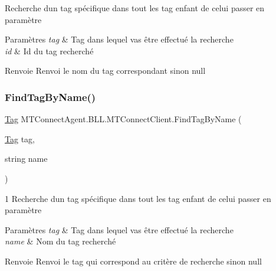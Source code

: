 Recherche d\textquotesingle{}un tag spécifique dans tout les tag enfant de celui passer en paramètre 


\begin{DoxyParams}{Paramètres}
{\em tag} & Tag dans lequel vas être effectué la recherche\\
\hline
{\em id} & Id du tag recherché\\
\hline
\end{DoxyParams}
\begin{DoxyReturn}{Renvoie}
Renvoi le nom du tag correspondant sinon null
\end{DoxyReturn}
\mbox{\label{class_m_t_connect_agent_1_1_b_l_l_1_1_m_t_connect_client_adf30641f680b3a6ea91414aedc30c176}} 
\subsubsection{\texorpdfstring{Find\+Tag\+By\+Name()}{FindTagByName()}}
{\footnotesize\ttfamily \mbox{\hyperlink{class_m_t_connect_agent_1_1_model_1_1_tag}{Tag}} M\+T\+Connect\+Agent.\+B\+L\+L.\+M\+T\+Connect\+Client.\+Find\+Tag\+By\+Name (\begin{DoxyParamCaption}\item[{\mbox{\hyperlink{class_m_t_connect_agent_1_1_model_1_1_tag}{Tag}}}]{tag,  }\item[{string}]{name }\end{DoxyParamCaption})\hspace{0.3cm}{\ttfamily [inline]}}



1 Recherche d\textquotesingle{}un tag spécifique dans tout les tag enfant de celui passer en paramètre 


\begin{DoxyParams}{Paramètres}
{\em tag} & Tag dans lequel vas être effectué la recherche\\
\hline
{\em name} & Nom du tag recherché\\
\hline
\end{DoxyParams}
\begin{DoxyReturn}{Renvoie}
Renvoi le tag qui correspond au critère de recherche sinon null
\end{DoxyReturn}
\mbox{\label{class_m_t_connect_agent_1_1_b_l_l_1_1_m_t_connect_client_a785a56a144ad88ed9b8c3efbcc046fde}} 

